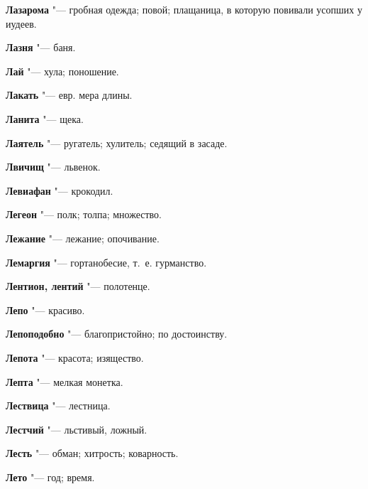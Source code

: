 \begin{mymulticols}{2}
\noindent\textbf{Лазарома} "--- гробная одежда; повой; плащаница, в которую повивали усопших у иудеев. 




\noindent\textbf{Лазня} "--- баня. 




\noindent\textbf{Лай} "--- хула; поношение. 




\noindent\textbf{Лакать} "--- евр. мера длины. 




\noindent\textbf{Ланита} "--- щека. 




\noindent\textbf{Лаятель} "--- ругатель; хулитель; седящий в засаде. 




\noindent\textbf{Лвичищ} "--- львенок. 




\noindent\textbf{Левиафан} "--- крокодил. 




\noindent\textbf{Легеон} "--- полк; толпа; множество. 




\noindent\textbf{Лежание} "--- лежание; опочивание. 




\noindent\textbf{Лемаргия} "--- гортанобесие, т.~е. гурманство. 




\noindent\textbf{Лентион, лентий} "--- полотенце. 




\noindent\textbf{Лепо} "--- красиво. 




\noindent\textbf{Лепоподобно} "--- благопристойно; по достоинству. 




\noindent\textbf{Лепота} "--- красота; изящество. 




\noindent\textbf{Лепта} "--- мелкая монетка. 




\noindent\textbf{Лествица} "--- лестница. 




\noindent\textbf{Лестчий} "--- льстивый, ложный. 




\noindent\textbf{Лесть} "--- обман; хитрость; коварность. 




\noindent\textbf{Лето} "--- год; время. 





\end{mymulticols}
